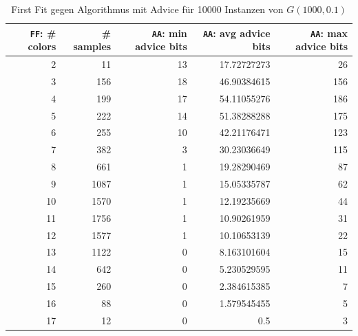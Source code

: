 \documentclass[11pt,abstracton]{scrreprt} %
\theoremstyle{definition}
\begin{document}
\begin{table}
\caption{First Fit gegen Algorithmus mit Advice für 10000 Instanzen von $G(1000, 0.1)$}
\label{tab.exp1p01}


  \centering
    \begin{tabular}{rrrrr}
    \toprule
    {\tt{FF}}: \# colors & \# samples & {\tt{AA}}: min advice bits & {\tt{AA}}: avg advice bits & {\tt{AA}}: max advice bits \\
    \midrule
2     & 11    & 13    & 17.72727273 & 26 \\
3     & 156   & 18    & 46.90384615 & 156 \\
4     & 199   & 17    & 54.11055276 & 186 \\
5     & 222   & 14    & 51.38288288 & 175 \\
6     & 255   & 10    & 42.21176471 & 123 \\
7     & 382   & 3     & 30.23036649 & 115 \\
8     & 661   & 1     & 19.28290469 & 87 \\
9     & 1087  & 1     & 15.05335787 & 62 \\
10    & 1570  & 1     & 12.19235669 & 44 \\
11    & 1756  & 1     & 10.90261959 & 31 \\
12    & 1577  & 1     & 10.10653139 & 22 \\
13    & 1122  & 0     & 8.163101604 & 15 \\
14    & 642   & 0     & 5.230529595 & 11 \\
15    & 260   & 0     & 2.384615385 & 7 \\
16    & 88    & 0     & 1.579545455 & 5 \\
17    & 12    & 0     & 0.5   & 3 \\

    \bottomrule
    \end{tabular}%

\end{table}
\end{document}
